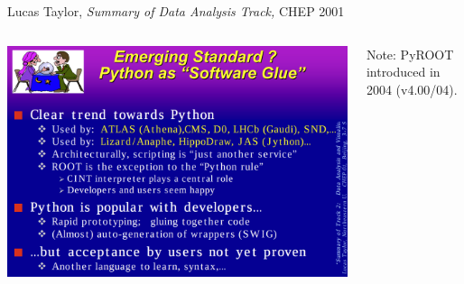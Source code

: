 \documentclass[aspectratio=169]{beamer}
\begin{document}
\begin{frame}{Lucas Taylor, {\it Summary of Data Analysis Track,} CHEP 2001}
\vspace{0.25 cm}
\begin{columns}

\includegraphics[width=\linewidth]{chep-2001-python.png}

Note: PyROOT introduced in 2004 (v4.00/04).
\end{columns}
\end{frame}
\end{document}
